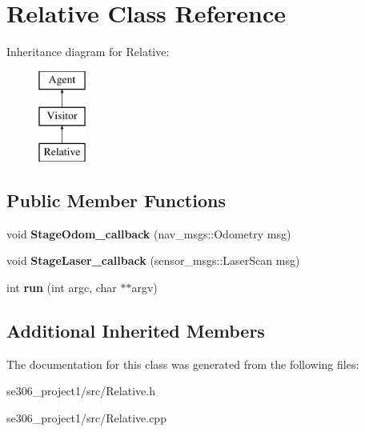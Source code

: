 \hypertarget{classRelative}{\section{Relative Class Reference}
\label{classRelative}
}
Inheritance diagram for Relative\-:\begin{figure}[H]
\begin{center}
\leavevmode
\includegraphics[height=3.000000cm]{classRelative}
\end{center}
\end{figure}
\subsection*{Public Member Functions}
\begin{DoxyCompactItemize}
\item 
\hypertarget{classRelative_a13fc6c65f7338cfa29c9f31958134c56}{void {\bfseries Stage\-Odom\-\_\-callback} (nav\-\_\-msgs\-::\-Odometry msg)}\label{classRelative_a13fc6c65f7338cfa29c9f31958134c56}

\item 
\hypertarget{classRelative_a556d177e5d1562ab9af5018ef382c836}{void {\bfseries Stage\-Laser\-\_\-callback} (sensor\-\_\-msgs\-::\-Laser\-Scan msg)}\label{classRelative_a556d177e5d1562ab9af5018ef382c836}

\item 
\hypertarget{classRelative_a966fc1a728e7b4ab9bde0cb636b5d7a9}{int {\bfseries run} (int argc, char $\ast$$\ast$argv)}\label{classRelative_a966fc1a728e7b4ab9bde0cb636b5d7a9}

\end{DoxyCompactItemize}
\subsection*{Additional Inherited Members}


The documentation for this class was generated from the following files\-:\begin{DoxyCompactItemize}
\item 
se306\-\_\-project1/src/Relative.\-h\item 
se306\-\_\-project1/src/Relative.\-cpp\end{DoxyCompactItemize}
